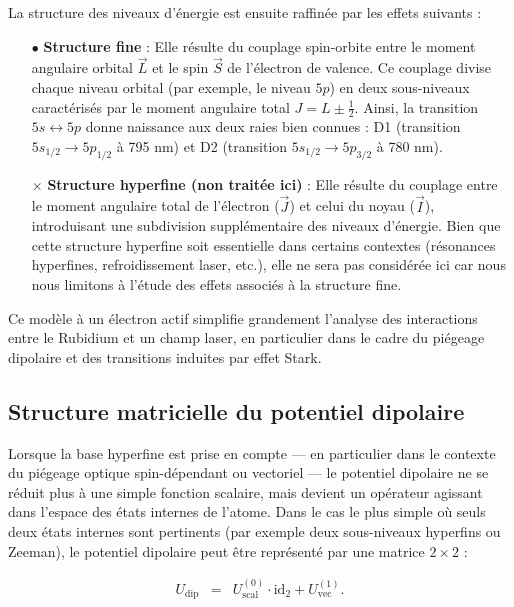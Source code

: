 La structure des niveaux d’énergie est ensuite raffinée par les effets suivants :
\begin{itemize}
  \item[$\bullet$] \textbf{Structure fine} : Elle résulte du couplage spin-orbite entre le moment angulaire orbital $\vec{L}$ et le spin $\vec{S}$ de l’électron de valence. Ce couplage divise chaque niveau orbital (par exemple, le niveau $5p$) en deux sous-niveaux caractérisés par le moment angulaire total $J = L \pm \tfrac{1}{2}$. Ainsi, la transition $5s \leftrightarrow 5p$ donne naissance aux deux raies bien connues : D1 (transition $5s_{1/2} \to 5p_{1/2}$ à 795 nm) et D2 (transition $5s_{1/2} \to 5p_{3/2}$ à 780 nm).
  
  \item[$\times$] \textbf{Structure hyperfine (non traitée ici)} : Elle résulte du couplage entre le moment angulaire total de l’électron ($\vec{J}$) et celui du noyau ($\vec{I}$), introduisant une subdivision supplémentaire des niveaux d’énergie. Bien que cette structure hyperfine soit essentielle dans certains contextes (résonances hyperfines, refroidissement laser, etc.), elle ne sera pas considérée ici car nous nous limitons à l’étude des effets associés à la structure fine.
\end{itemize}

Ce modèle à un électron actif simplifie grandement l’analyse des interactions entre le Rubidium et un champ laser, en particulier dans le cadre du piégeage dipolaire et des transitions induites par effet Stark.


\subsection{Structure matricielle du potentiel dipolaire}

Lorsque la base hyperfine est prise en compte — en particulier dans le contexte du piégeage optique spin-dépendant ou vectoriel — le potentiel dipolaire ne se réduit plus à une simple fonction scalaire, mais devient un opérateur agissant dans l’espace des états internes de l’atome. Dans le cas le plus simple où seuls deux états internes sont pertinents (par exemple deux sous-niveaux hyperfins ou Zeeman), le potentiel dipolaire peut être représenté par une matrice $2 \times 2$ :

\begin{eqnarray}
U_{\mathrm{dip}} &=& U_{\mathrm{scal}}^{(0)} \cdot \mbox{id}_2 
+ U_{\mathrm{vec}}^{(1)}.
\end{eqnarray}

